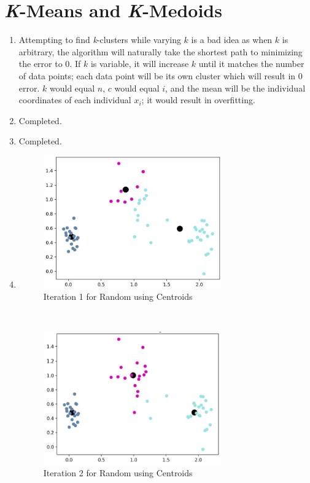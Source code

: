 \documentclass[11pt]{article}
\newcommand{\solution}[1]{{{\color{blue}{\bf Solution:} {#1}}}}
\begin{document}
\section{\textit{K}-Means and \textit{K}-Medoids}
\begin{enumerate}
\item
\solution{
Attempting to find \textit{k}-clusters while varying $k$ is a bad idea as when $k$ is arbitrary, the algorithm will naturally take the shortest path to minimizing the error to 0. If $k$ is variable, it will increase $k$ until it matches the number of data points; each data point will be its own cluster which will result in 0 error. $k$ would equal $n$, $c$ would equal $i$, and the mean will be the individual coordinates of each individual $x_i$; it would result in overfitting.
}
\item
\solution{Completed.}
\item
\solution{Completed.}
\item
\solution{
\begin{figure}[!htbp]
    \centering
    \includegraphics[width=3in]{1randomcentroid.png}
    \caption{Iteration 1 for Random using Centroids} 
\end{figure} \\
\begin{figure}[!htbp]
    \centering
    \includegraphics[width=3in]{2randomcentroid.png}
    \caption{Iteration 2 for Random using Centroids} 
\end{figure} \\
}
\end{enumerate}
\end{document}
